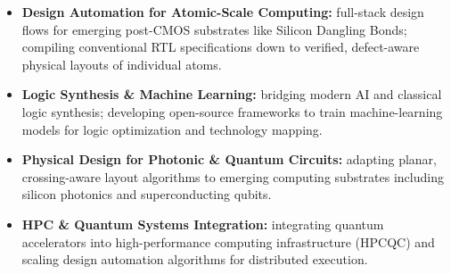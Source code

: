 

\begin{cvparagraph}
\begin{itemize}[leftmargin=2ex, nosep, noitemsep]
  \renewcommand{\labelitemi}{\textcolor{awesome}{\textbullet}}
  \item \textbf{Design Automation for Atomic-Scale Computing:} full-stack design flows for emerging post-CMOS substrates like Silicon Dangling Bonds; compiling conventional RTL specifications down to verified, defect-aware physical layouts of individual atoms.
  \item \textbf{Logic Synthesis \& Machine Learning:} bridging modern AI and classical logic synthesis; developing open-source frameworks to train machine-learning models for logic optimization and technology mapping.
  \item \textbf{Physical Design for Photonic \& Quantum Circuits:} adapting planar, crossing-aware layout algorithms to emerging computing substrates including silicon photonics and superconducting qubits.
  \item \textbf{HPC \& Quantum Systems Integration:} integrating quantum accelerators into high-performance computing infrastructure (HPCQC) and scaling design automation algorithms for distributed execution.
\end{itemize}
\end{cvparagraph}
